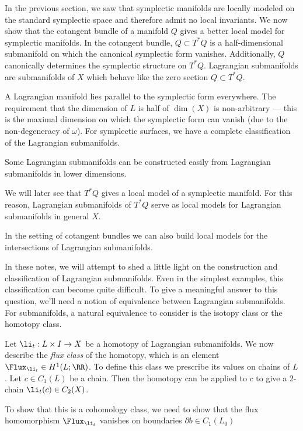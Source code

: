 

In the previous section, we saw that symplectic manifolds are locally modeled on the standard symplectic space and therefore admit no local invariants. 
We now show that the cotangent bundle of a manifold $Q$ gives a better local model for symplectic manifolds.
In the cotangent bundle, $Q\subset T^*Q$ is a half-dimensional submanifold on which the canonical symplectic form vanishes.
Additionally, $Q$  canonically determines the symplectic structure on $T^*Q$.
Lagrangian submanifolds are submanifolds of $X$ which behave like the zero section $Q\subset T^*Q$.

A Lagrangian manifold lies parallel to the symplectic form everywhere.
The requirement that the dimension of $L$ is half of  $\dim(X)$ is non-arbitrary --- this is the maximal dimension on which the symplectic form can vanish (due to the non-degeneracy of $\omega$).
For symplectic surfaces, we have a complete classification of the Lagrangian submanifolds. 

Some Lagrangian submanifolds can be constructed easily from Lagrangian submanifolds in lower dimensions.

We will later see that  $T^*Q$ gives a local model of a symplectic manifold. For this reason, Lagrangian submanifolds of $T^*Q$  serve as local models for Lagrangian submanifolds in general $X$.


In the setting of cotangent bundles we can also build local models for the intersections of Lagrangian submanifolds.

In these notes, we will attempt to shed a little light on the construction and classification of Lagrangian submanifolds. 
Even in the simplest examples, this classification can become quite difficult. 
To give a meaningful answer to this question, we'll need a notion of equivalence between Lagrangian submanifolds. 
For submanifolds, a natural equivalence to consider is the isotopy class or the homotopy class.

Let $\li_t: L\times I\to X$ be a homotopy of Lagrangian submanifolds.
We now describe the \emph{flux class} of the homotopy, which is an element $\Flux_{\li_t}\in H^1(L;\RR)$.
To define this class we prescribe its values on chains of $L$. 
Let $c\in C_1(L)$ be a chain. 
Then the homotopy can be applied to $c$ to give a 2-chain $\li_t(c)\in C_2(X)$. 

To show that this is a cohomology class, we need to show that the flux homomorphism $\Flux_{\li_t}$ vanishes on boundaries $\partial b\in C_1(L_0)$ 

